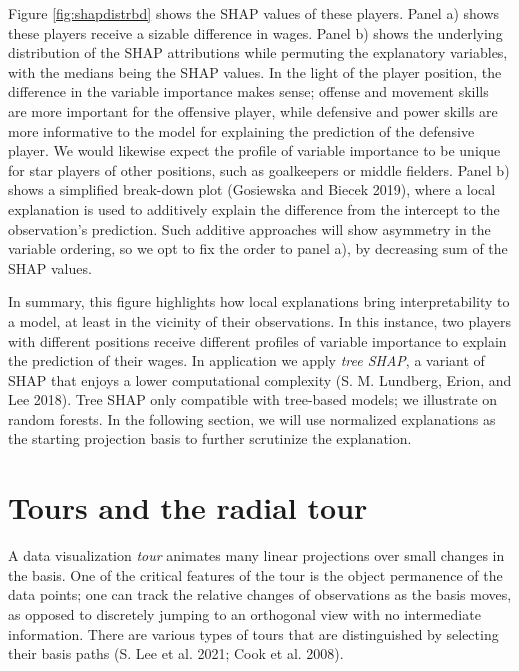 \documentclass[
  article]{article}
\begin{document}
Figure \ref{fig:shapdistrbd} shows the SHAP values of these players. Panel a) shows these players receive a sizable difference in wages. Panel b) shows the underlying distribution of the SHAP attributions while permuting the explanatory variables, with the medians being the SHAP values. In the light of the player position, the difference in the variable importance makes sense; offense and movement skills are more important for the offensive player, while defensive and power skills are more informative to the model for explaining the prediction of the defensive player. We would likewise expect the profile of variable importance to be unique for star players of other positions, such as goalkeepers or middle fielders. Panel b) shows a simplified break-down plot (Gosiewska and Biecek 2019), where a local explanation is used to additively explain the difference from the intercept to the observation's prediction. Such additive approaches will show asymmetry in the variable ordering, so we opt to fix the order to panel a), by decreasing sum of the SHAP values.

In summary, this figure highlights how local explanations bring interpretability to a model, at least in the vicinity of their observations. In this instance, two players with different positions receive different profiles of variable importance to explain the prediction of their wages. In application we apply \emph{tree SHAP}, a variant of SHAP that enjoys a lower computational complexity (S. M. Lundberg, Erion, and Lee 2018). Tree SHAP only compatible with tree-based models; we illustrate on random forests. In the following section, we will use normalized explanations as the starting projection basis to further scrutinize the explanation.

\hypertarget{tours-and-the-radial-tour}{%
\section{Tours and the radial tour}\label{tours-and-the-radial-tour}}

A data visualization \emph{tour} animates many linear projections over small changes in the basis. One of the critical features of the tour is the object permanence of the data points; one can track the relative changes of observations as the basis moves, as opposed to discretely jumping to an orthogonal view with no intermediate information. There are various types of tours that are distinguished by selecting their basis paths (S. Lee et al. 2021; Cook et al. 2008).
\end{document}
